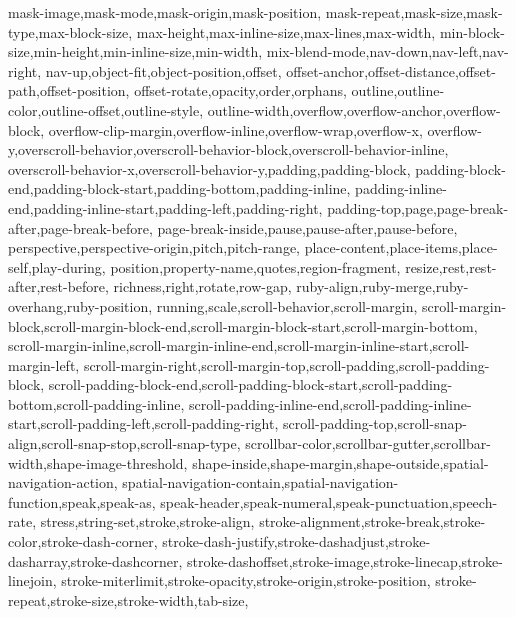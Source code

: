 {{      mask-image,mask-mode,mask-origin,mask-position,
      mask-repeat,mask-size,mask-type,max-block-size,
      max-height,max-inline-size,max-lines,max-width,
      min-block-size,min-height,min-inline-size,min-width,
      mix-blend-mode,nav-down,nav-left,nav-right,
      nav-up,object-fit,object-position,offset,
      offset-anchor,offset-distance,offset-path,offset-position,
      offset-rotate,opacity,order,orphans,
      outline,outline-color,outline-offset,outline-style,
      outline-width,overflow,overflow-anchor,overflow-block,
      overflow-clip-margin,overflow-inline,overflow-wrap,overflow-x,
      overflow-y,overscroll-behavior,overscroll-behavior-block,overscroll-behavior-inline,
      overscroll-behavior-x,overscroll-behavior-y,padding,padding-block,
      padding-block-end,padding-block-start,padding-bottom,padding-inline,
      padding-inline-end,padding-inline-start,padding-left,padding-right,
      padding-top,page,page-break-after,page-break-before,
      page-break-inside,pause,pause-after,pause-before,
      perspective,perspective-origin,pitch,pitch-range,
      place-content,place-items,place-self,play-during,
      position,property-name,quotes,region-fragment,
      resize,rest,rest-after,rest-before,
      richness,right,rotate,row-gap,
      ruby-align,ruby-merge,ruby-overhang,ruby-position,
      running,scale,scroll-behavior,scroll-margin,
      scroll-margin-block,scroll-margin-block-end,scroll-margin-block-start,scroll-margin-bottom,
      scroll-margin-inline,scroll-margin-inline-end,scroll-margin-inline-start,scroll-margin-left,
      scroll-margin-right,scroll-margin-top,scroll-padding,scroll-padding-block,
      scroll-padding-block-end,scroll-padding-block-start,scroll-padding-bottom,scroll-padding-inline,
      scroll-padding-inline-end,scroll-padding-inline-start,scroll-padding-left,scroll-padding-right,
      scroll-padding-top,scroll-snap-align,scroll-snap-stop,scroll-snap-type,
      scrollbar-color,scrollbar-gutter,scrollbar-width,shape-image-threshold,
      shape-inside,shape-margin,shape-outside,spatial-navigation-action,
      spatial-navigation-contain,spatial-navigation-function,speak,speak-as,
      speak-header,speak-numeral,speak-punctuation,speech-rate,
      stress,string-set,stroke,stroke-align,
      stroke-alignment,stroke-break,stroke-color,stroke-dash-corner,
      stroke-dash-justify,stroke-dashadjust,stroke-dasharray,stroke-dashcorner,
      stroke-dashoffset,stroke-image,stroke-linecap,stroke-linejoin,
      stroke-miterlimit,stroke-opacity,stroke-origin,stroke-position,
      stroke-repeat,stroke-size,stroke-width,tab-size,
}}
